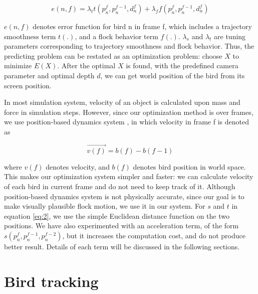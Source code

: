 \begin{equation}\label{eq:2}
 e(n,f) = \lambda_tt(p_n^f, p_n^{f-1},d_n^f) + \lambda_ff(p_n^f, p_n^{f-1},d_n^f)
\end{equation}


$e(n,f)$ denotes error function for bird n in frame f, which includes a trajectory smoothness term $t(.)$, and a flock behavior term $f(.)$. $\lambda_s$ and $\lambda_t$ are tuning parameters corresponding to trajectory smoothness and flock behavior. Thus, the predicting problem can be restated as an optimization problem: choose $X$ to minimize $E(X)$. After the optimal $X$ is found, with the predefined camera parameter and optimal depth $d$, we can get world position of the bird from its screen position.


In most simulation system, velocity of an object is calculated upon mass and force in simulation steps. However, since our optimization method is over frames, we use position-based dynamics system \cite{PBD}, in which velocity in frame f is denoted as

\begin{equation}\label{eq:3}
 \vec{v(f)} = b(f)-b(f-1)
\end{equation}

where $v(f)$ denotes velocity, and $b(f)$ denotes bird position in world space. This makes our optimization system simpler and faster: we can calculate velocity of each bird in current frame and do not need to keep track of it. Although position-based dynamics system is not physically accurate, since our goal is to make visually plausible flock motion, we use it in our system.
For $s$ and $t$ in equation \ref{eq:2}, we use the simple Euclidean distance function on the two positions. We have also experimented with an acceleration term, of the form $s(p_n^f, p_n^{f-1}, p_n^{f-2})$, but it increases the computation cost, and do not produce better result. Details of each term will be discussed in the following sections.


\section{Bird tracking}


